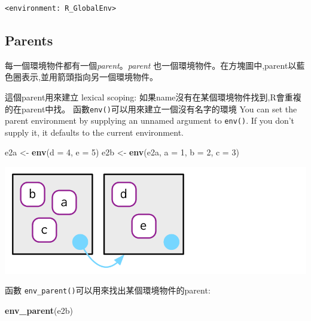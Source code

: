 \documentclass[]{book}
\newenvironment{Shaded}{\begin{snugshade}}{\end{snugshade}}
\newcommand{\DataTypeTok}[1]{\textcolor[rgb]{0.13,0.29,0.53}{#1}}
\newcommand{\DecValTok}[1]{\textcolor[rgb]{0.00,0.00,0.81}{#1}}
\newcommand{\KeywordTok}[1]{\textcolor[rgb]{0.13,0.29,0.53}{\textbf{#1}}}
\newcommand{\NormalTok}[1]{#1}
\newcommand{\StringTok}[1]{\textcolor[rgb]{0.31,0.60,0.02}{#1}}
\theoremstyle{definition}
\theoremstyle{definition}
\theoremstyle{definition}
\theoremstyle{remark}
\begin{document}
\begin{verbatim}
<environment: R_GlobalEnv>
\end{verbatim}

\hypertarget{parents}{%
\subsection{Parents}\label{parents}}

每一個環境物件都有一個\emph{parent}。\emph{parent}
也一個環境物件。在方塊圖中,parent以藍色圈表示,並用箭頭指向另一個環境物件。

這個parent用來建立 lexical scoping:
如果name沒有在某個環境物件找到,R會重複的在parent中找。
函數\texttt{env()}可以用來建立一個沒有名字的環境 You can set the parent
environment by supplying an unnamed argument to \texttt{env()}. If you
don't supply it, it defaults to the current environment.

\begin{Shaded}
\begin{Highlighting}[]
\NormalTok{e2a <-}\StringTok{ }\KeywordTok{env}\NormalTok{(}\DataTypeTok{d =} \DecValTok{4}\NormalTok{, }\DataTypeTok{e =} \DecValTok{5}\NormalTok{)}
\NormalTok{e2b <-}\StringTok{ }\KeywordTok{env}\NormalTok{(e2a, }\DataTypeTok{a =} \DecValTok{1}\NormalTok{, }\DataTypeTok{b =} \DecValTok{2}\NormalTok{, }\DataTypeTok{c =} \DecValTok{3}\NormalTok{)}
\end{Highlighting}
\end{Shaded}

\begin{center}\includegraphics{diagrams/environments/parents} \end{center}

函數 \texttt{env\_parent()}可以用來找出某個環境物件的parent:

\begin{Shaded}
\begin{Highlighting}[]
\KeywordTok{env_parent}\NormalTok{(e2b)}
\end{Highlighting}
\end{Shaded}
\end{document}
